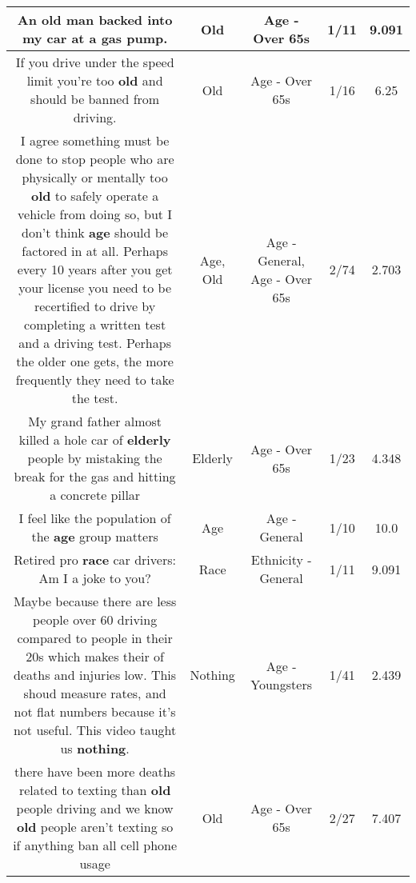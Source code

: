 \documentclass[11pt]{article}
\newlength\mylength
\begin{document}
\begin{center}
\begin{longtable}{|C{.65\mylength}|C{.30\mylength}|C{.12\mylength}|C{.12\mylength}|C{.12\mylength}|}
  \small An \textbf{old} man backed into my car at a gas pump.\normalsize   & Old & Age - Over 65s & 1/11 & 9.091 \\  \hline
  \small If you drive under the speed limit you're too \textbf{old} and should be banned from driving.\normalsize   & Old & Age - Over 65s & 1/16 & 6.25 \\  \hline
  \small I agree something must be done to stop people who are physically or mentally too \textbf{old} to safely operate a vehicle from doing so, but I don't think \textbf{age} should be factored in at all. Perhaps every 10 years after you get your license you need to be recertified to drive by completing a written test and a driving test. Perhaps the older one gets, the more frequently they need to take the test.\normalsize   & Age, Old & Age - General, Age - Over 65s & 2/74 & 2.703 \\  \hline
  \small My grand father almost killed a hole car of \textbf{elderly} people by mistaking the break for the gas and hitting a concrete pillar\normalsize   & Elderly & Age - Over 65s & 1/23 & 4.348 \\  \hline
  \small I feel like the population of the \textbf{age} group matters\normalsize   & Age & Age - General & 1/10 & 10.0 \\  \hline
  \small Retired pro \textbf{race} car drivers: Am I a joke to you?\normalsize   & Race & Ethnicity - General & 1/11 & 9.091 \\  \hline
  \small Maybe because there are less people over 60 driving compared to people in their 20s which makes their  of deaths and injuries low. This shoud measure rates, and not flat numbers because it's not useful. This video taught us \textbf{nothing}.\normalsize   & Nothing & Age - Youngsters & 1/41 & 2.439 \\  \hline
  \small there have been more deaths related to texting than \textbf{old} people driving and we know \textbf{old} people aren't texting so if anything ban all cell phone usage\normalsize   & Old & Age - Over 65s & 2/27 & 7.407 \\  \hline

\end{longtable}
\end{center}
\end{document}
